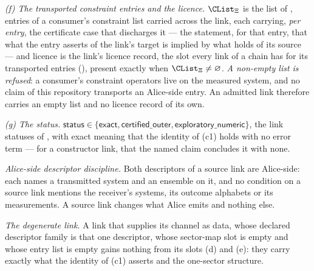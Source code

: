 \begin{definition}
\emph{(f) The transported constraint entries and the licence.}
$\CList_{\Xi}$ is the list of , entries
of a consumer's constraint list carried across the link, each
carrying, \emph{per entry}, the certificate case that discharges it --- the
statement, for that entry, that what the entry asserts of the link's target
is implied by what holds of its source --- and \textsf{licence} is the
link's licence record, the slot every link of a chain has for its transported
entries (), present exactly when
$\CList_{\Xi}\ne\varnothing$. \emph{A non-empty list is refused}: a
consumer's constraint operators live on the measured system, and no claim of
this repository transports an Alice-side entry. An admitted link therefore
carries an empty list and no licence record of its own.

\emph{(g) The status.}
$\textsf{status}\in\{\textsf{exact},\textsf{certified\_outer},
\textsf{exploratory\_numeric}\}$, the link statuses of
, with \textsf{exact} meaning that the
identity of (c1) holds with no error term --- for a constructor link, that
the named claim concludes it with none.

\emph{Alice-side descriptor discipline.} Both descriptors of a source link
are Alice-side: each names a transmitted system and an ensemble on it, and
no condition on a source link mentions the receiver's systems, its outcome
alphabets or its measurements. A source link changes what Alice emits and
nothing else.

\emph{The degenerate link.} A link that supplies its channel as data, whose
declared descriptor family is that one descriptor, whose sector-map slot is
empty and whose entry list is empty gains nothing from its slots (d) and
(e): they carry exactly what the identity of (c1) asserts and the one-sector
structure.
\end{definition}
